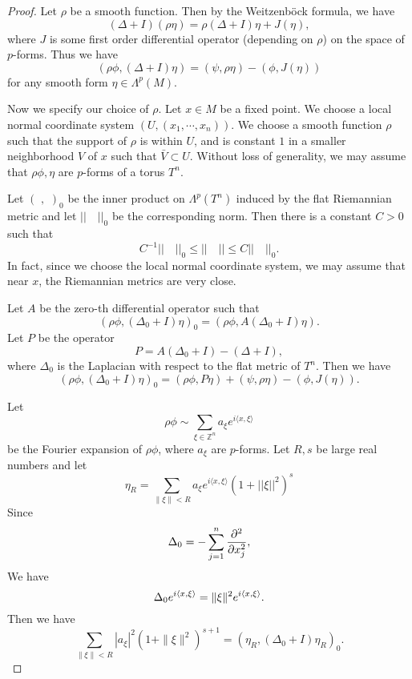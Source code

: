 \begin{proof}

Let $\rho$ be a smooth function. Then by the Weitzenb\"ock formula, we have
\begin{equation}\label{rst}
(\Delta+I)(\rho\eta)=\rho(\Delta+I)\eta+J(\eta),
\end{equation}
where $J$ is some first order differential operator (depending on $\rho$) on the space of $p$-forms. Thus we have
\begin{equation}\label{pqr}
(\rho\phi, (\Delta+I)\eta)=(\psi,\rho\eta)-(\phi,J(\eta))
\end{equation}
for any smooth form $\eta\in\Lambda^p(M)$.

Now we specify our choice of $\rho$. Let $x\in M$ be a fixed point. We choose a local normal coordinate system $(U,(x_1,\cdots,x_n))$. We choose a smooth function $\rho$ such that
the support of $\rho$ is within $U$, and is constant $1$ in a smaller neighborhood $V$ of $x$ such that $\bar V\subset U$. Without loss of generality, we may assume that $\rho\phi,\eta$ are $p$-forms of a  torus $T^n$.

Let $(\,\,,\,\,)_0$ be the inner product on $\Lambda^p(T^n)$ induced by the flat Riemannian metric and let $||\quad||_0$ be the corresponding norm. Then there is a constant $C>0$ such that
\[
C^{-1}||\quad||_0\leq ||\quad||\leq C||\quad||_0.
\]
In fact, since we choose the local normal coordinate system, we may assume that near $x$, the Riemannian metrics are very close. 

Let $A$ be the zero-th differential operator such that
\[
(\rho\phi,(\Delta_0+I)\eta)_0=(\rho\phi, A(\Delta_0+I)\eta).
\]
Let $P$ be the operator
\[
P=A(\Delta_0+I)-(\Delta+I),
\]
where $\Delta_0$ is the Laplacian with respect to the flat metric of $T^n$. Then we have
\[
(\rho\phi,(\Delta_0+I)\eta)_0=(\rho\phi, P\eta)+(\psi,\rho\eta)-(\phi, J(\eta)).
\]



Let
\[
\rho\phi\sim\sum_{\xi\in\mathbb Z^n}a_\xi e^{i\langle x,\xi\rangle}
\]
be the Fourier expansion of $\rho\phi$, where $a_\xi$ are  $p$-forms.
Let $R,s$ be  large real numbers and let 
\[
\eta_R=\sum_{\|\xi\|<R}a_\xi e^{i\langle x,\xi\rangle}(1+||\xi||^2)^{s}
\]
Since
\[
\Delta_0=-\sum_{j=1}^n\frac{\partial^2}{\partial x_j^2},
\]
We have
\[
\Delta_0e^{i\langle x,\xi\rangle}=\|\xi\|^2e^{i\langle x,\xi\rangle}.
\]
Then we have
\begin{equation}\label{12}
\sum_{\|\xi\|<R}|a_\xi|^2(1+\|\xi\|^2)^{s+1}=(\eta_R,(\Delta_0+I)\eta_R)_0.
\end{equation}


\end{proof}
